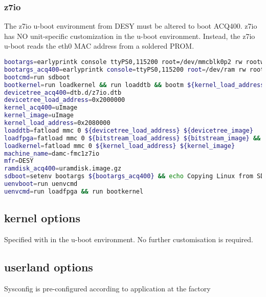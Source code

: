\documentclass[]{article}
\begin{document}
\subsubsection{z7io}
The z7io u-boot environment from DESY must be altered to boot ACQ400.
z7io has NO unit-specific customization in the u-boot environment. Instead, the z7io u-boot reads the eth0 MAC address from a soldered PROM.

\begin{lstlisting}[language=bash,style=bashstyle,frame=single]
bootargs=earlyprintk console ttyPS0,115200 root=/dev/mmcblk0p2 rw rootwait
bootargs_acq400=earlyprintk console=ttyPS0,115200 root=/dev/ram rw rootwait
bootcmd=run sdboot
bootkernel=run loadkernel && run loaddtb && bootm ${kernel_load_address} - ${devicetree_load_address}
devicetree_acq400=dtb.d/z7io.dtb
devicetree_load_address=0x2000000
kernel_acq400=uImage
kernel_image=uImage
kernel_load_address=0x2080000
loaddtb=fatload mmc 0 ${devicetree_load_address} ${devicetree_image}
loadfpga=fatload mmc 0 ${bitstream_load_address} ${bitstream_image} && fpga ${bitstream_type} 0 ${bitstream_load_address} ${filesize}
loadkernel=fatload mmc 0 ${kernel_load_address} ${kernel_image}
machine_name=damc-fmc1z7io
mfr=DESY
ramdisk_acq400=uramdisk.image.gz
sdboot=setenv bootargs ${bootargs_acq400} && echo Copying Linux from SD to RAM... && mmcinfo && fatload mmc 0 0x3000000 ${kernel_acq400} && fatload mmc 0 0x2A00000 ${devicetree_acq400} && fatload mmc 0 0x2000000 ${ramdisk_acq400} && bootm 0x3000000 0x2000000 0x2A00000
uenvboot=run uenvcmd
uenvcmd=run loadfpga && run bootkernel
\end{lstlisting}

\subsection{kernel options}
Specified with  in the u-boot environment. No further customisation is required.

\pagebreak
\subsection{userland options}

Sysconfig is pre-configured according to application at the factory
\end{document}
